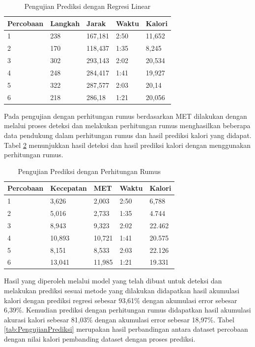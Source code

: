 \begin{table}
  \caption{Pengujian Prediksi dengan Regresi Linear}
  \label{tab:PengujianPrediksiRegresi}
  \centering
  \begin{tabular}{lllll}
    \toprule
    Percobaan & Langkah & Jarak  &  Waktu & Kalori \\
    \midrule
    1   & 238   & 167,181    & 2:50    & 11,652  \\
    2   & 170   & 118,437    & 1:35    & 8,245   \\
    3   & 302   & 293,143    & 2:02    & 20,534  \\
    4   & 248   & 284,417    & 1:41    & 19,927  \\
    5   & 322   & 287,577    & 2:03    & 20,14   \\
    6   & 218   & 286,18     & 1:21    & 20,056  \\
    \bottomrule
  \end{tabular}
\end{table}

Pada pengujian dengan perhitungan rumus berdasarkan MET dilakukan dengan melalui proses deteksi dan melakukan perhitungan rumus menghasilkan beberapa data pendukung dalam perhitungan rumus dan hasil prediksi kalori yang didapat. Tabel \ref{tab:PengujianPrediksiPerhitungan} menunjukkan hasil deteksi dan hasil prediksi kalori dengan menggunakan perhitungan rumus.

\begin{table}
  \caption{Pengujian Prediksi dengan Perhitungan Rumus}
  \label{tab:PengujianPrediksiPerhitungan}
  \centering
  \begin{tabular}{lllll}
    \toprule
    Percobaan & Kecepatan & MET  &  Waktu & Kalori \\
    \midrule
    1   & 3,626   & 2,003    & 2:50    & 6,788   \\
    2   & 5,016   & 2,733    & 1:35    & 4.744   \\
    3   & 8,943   & 9,323    & 2:02    & 22.462  \\
    4   & 10,893  & 10,721   & 1:41    & 20.575  \\
    5   & 8,151   & 8,533    & 2:03    & 22.126  \\
    6   & 13,041  & 11,985   & 1:21    & 19.331  \\
    \bottomrule
  \end{tabular}
\end{table}

Hasil yang diperoleh melalui model yang telah dibuat untuk deteksi dan melakukan prediksi sesuai metode yang dilakukan didapatkan hasil akumulasi kalori dengan prediksi regresi sebesar 93,61\% dengan akumulasi error sebesar 6,39\%. Kemudian prediksi dengan perhitungan rumus didapatkan hasil akumulasi akurasi kalori sebesar 81,03\% dengan akumulasi error sebesar 18,97\%. Tabel \ref{tab:PengujianPrediksi} merupakan hasil perbandingan antara dataset percobaan dengan nilai kalori pembanding dataset dengan proses prediksi.

